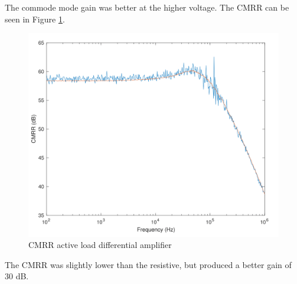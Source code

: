 The commode mode gain was better at the higher voltage. The CMRR can be seen in Figure \ref{fig:CMRRactive}.

\begin{figure}[H]
    \center
    \includegraphics[width=.6\textwidth]{ExperimentalImplementation/Active_CMRR_Both.png}
    \caption{CMRR active load differential amplifier}
    \label{fig:CMRRactive}
\end{figure}

The CMRR was slightly lower than the resistive, but produced a better gain of 30 dB.






